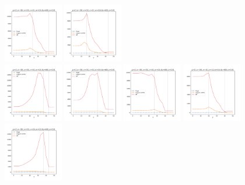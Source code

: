 \documentclass[a4paper]{article}
\begin{document}
\begin{figure}[H]
  \includegraphics[width=0.23\textwidth]{grid-g2-v4-w3_0}
  \includegraphics[width=0.23\textwidth]{grid-g2-v4-w4_0}
  \\
  \includegraphics[width=0.23\textwidth]{grid-g2-v5-w1_0}
  \includegraphics[width=0.23\textwidth]{grid-g2-v5-w2_0}
  \includegraphics[width=0.23\textwidth]{grid-g2-v5-w3_0}
  \includegraphics[width=0.23\textwidth]{grid-g2-v5-w4_0}
  \\
  \includegraphics[width=0.23\textwidth]{grid-g2-v6-w1_0}

\end{figure}
\end{document}
